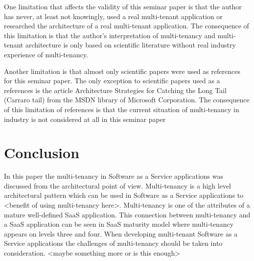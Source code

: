\documentclass[conference]{sasmoota2017}
\begin{document}
One limitation that affects the validity of this seminar paper is that the author has never, at least not knowingly, used a real multi-tenant application or researched the architecture of a real multi-tenant application. The consequence of this limitation is that the author’s interpretation of multi-tenancy and multi-tenant architecture is only based on scientific literature without real industry experience of multi-tenancy. 

Another limitation is that almost only scientific papers were used as references for this seminar paper. The only exception to scientific papers used as a references is the article Architecture Strategies for Catching the Long Tail (Carraro tail) from the MSDN library of Microsoft Corporation. The consequence of this limitation of references is that the current situation of multi-tenancy in industry is not considered at all in this seminar paper

\section{Conclusion}

In this paper the multi-tenancy in Software as a Service applications was discussed from the architectural point of view. Multi-tenancy is a high level architectural pattern which can be used in Software as a Service applications to <benefit of using multi-tenancy here>. Multi-tenancy is one of the attributes of a mature well-defined SaaS application. This connection between multi-tenancy and a SaaS application can be seen in SaaS maturity model where multi-tenancy appears on levels three and four. When developing multi-tenant Software as a Service applications the challenges of multi-tenancy should be taken into consideration. <maybe something more or is this enough> 







%
%
%



%
%



\end{document}
